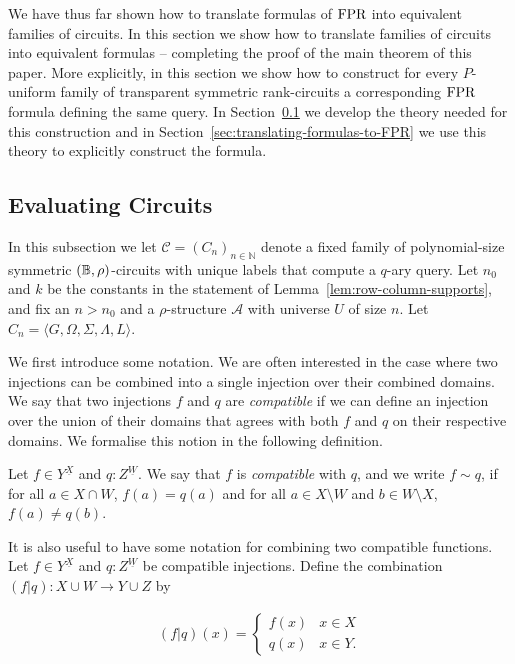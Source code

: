 \documentclass[../main/thesis.tex]{subfiles}
\begin{document}
We have thus far shown how to translate formulas of $\text{\upshape FPR}$ into equivalent
families of circuits. In this section we show how to translate families of
circuits into equivalent formulas -- completing the proof of the main theorem of
this paper. More explicitly, in this section we show how to construct for every
$P$-uniform family of transparent symmetric rank-circuits a corresponding $\text{\upshape FPR}$
formula defining the same query. In Section~\ref{sec:evaluating-circuits} we
develop the theory needed for this construction and in
Section~\ref{sec:translating-formulas-to-FPR} we use this theory to explicitly
construct the formula.

\subsection {Evaluating Circuits}\label{sec:evaluating-circuits}
In this subsection we let $\mathcal{C} = (C_n)_{n \in \mathbb{N}}$ denote a
fixed family of polynomial-size symmetric $(\mathbb{B},\rho)$-circuits with unique
labels that compute a $q$-ary query. Let $n_0$ and $k$ be the constants in the
statement of Lemma~\ref{lem:row-column-supports}, and fix an $n > n_0$ and a
$\rho$-structure $\mathcal{A}$ with universe $U$ of size $n$. Let $C_n = \langle
G, \Omega, \Sigma, \Lambda, L \rangle$.

We first introduce some notation. We are often interested in the case where two
injections can be combined into a single injection over their combined domains.
We say that two injections $f$ and $q$ are \emph{compatible} if we can define an
injection over the union of their domains that agrees with both $f$ and $q$ on
their respective domains. We formalise this notion in the following definition.

\begin{definition}
	Let $f \in Y^{\underline{X}}$ and $q : Z^{\underline{W}}$. We say that $f$ is
  \emph{compatible} with $q$, and we write $f \sim q$, if for all $a \in X \cap
  W$, $f(a) = q(a)$ and for all $a \in X \setminus W$ and $b \in W \setminus X$,
  $f(a) \neq q(b)$.
\end{definition}

It is also useful to have some notation for combining two compatible functions.
Let $f \in Y^{\underline{X}}$ and $q : Z^{\underline{W}}$ be compatible
injections. Define the combination $(f | q): X \cup W \rightarrow Y \cup Z$ by

\begin{align*}
	(f \vert q) (x) =
	\begin{cases}
    f (x) & x \in X  \\
    q (x) & x \in Y.
	\end{cases}
\end{align*}
\end{document}

